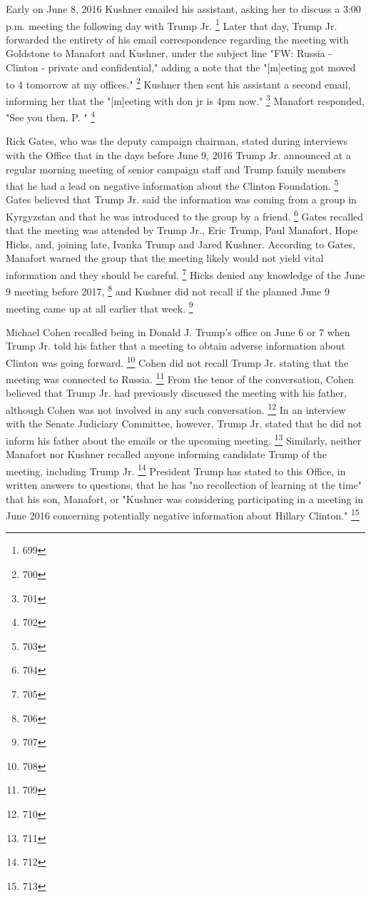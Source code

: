 Early on June 8, 2016 Kushner emailed his assistant, asking her to discuss a 3:00 p.m. meeting the following day with Trump Jr.%
\footnote{699}
Later that day, Trump Jr. forwarded the entirety of his email correspondence regarding the meeting with Goldstone to Manafort and Kushner, under the subject line "FW: Russia - Clinton - private and confidential," adding a note that the "[m]eeting got moved to 4 tomorrow at my offices."%
\footnote{700}
Kushner then sent his assistant a second email, informing her that the "[m]eeting with don jr is 4pm now."%
\footnote{701}
Manafort responded, "See you then. P. "%
\footnote{702}

Rick Gates, who was the deputy campaign chairman, stated during interviews with the Office that in the days before June 9, 2016 Trump Jr. announced at a regular morning meeting of senior campaign staff and Trump family members that he had a lead on negative information about the Clinton Foundation.%
\footnote{703}
Gates believed that Trump Jr. said the information was coming from a group in Kyrgyzstan and that he was introduced to the group by a friend.%
\footnote{704}
Gates recalled that the meeting was attended by Trump Jr., Eric Trump, Paul Manafort, Hope Hicks, and, joining late, Ivanka Trump and Jared Kushner.
According to Gates, Manafort warned the group that the meeting likely would not yield vital information and they should be careful.%
\footnote{705}
Hicks denied any knowledge of the June 9 meeting before 2017,%
\footnote{706}
and Kushner did not recall if the planned June 9 meeting came up at all earlier that week.%
\footnote{707}

Michael Cohen recalled being in Donald J. Trump's office on June 6 or 7 when Trump Jr. told his father that a meeting to obtain adverse information about Clinton was going forward.%
\footnote{708}
Cohen did not recall Trump Jr. stating that the meeting was connected to Russia.%
\footnote{709}
From the tenor of the conversation, Cohen believed that Trump Jr. had previously discussed the meeting with his father, although Cohen was not involved in any such conversation.%
\footnote{710}
In an interview with the Senate Judiciary Committee, however, Trump Jr. stated that he did not inform his father about the emails or the upcoming meeting.%
\footnote{711}
Similarly, neither Manafort nor Kushner recalled anyone informing candidate Trump of the meeting, including Trump Jr.%
\footnote{712}
President Trump has stated to this Office, in written answers to questions, that he has "no recollection of learning at the time" that his son, Manafort, or "Kushner was considering participating in a meeting in June 2016 concerning potentially negative information about Hillary Clinton."%
\footnote{713}

